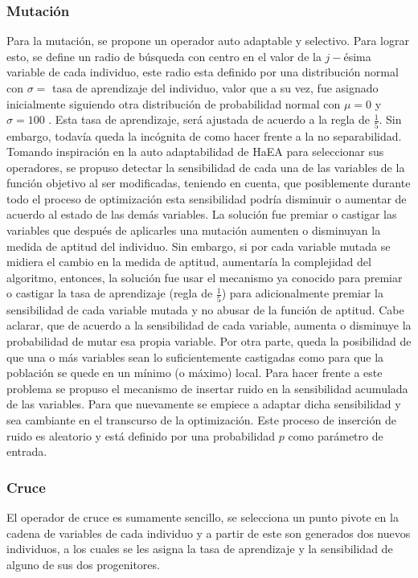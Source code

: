 \documentclass{llncs}
\begin{document}
\subsubsection{Mutación}
Para la mutación, se propone un operador auto adaptable y selectivo. Para lograr esto, se define un radio de búsqueda con centro en el valor de la $j-$ésima variable de cada individuo, este radio esta definido por una distribución normal con $\sigma=$ tasa de aprendizaje del individuo, valor que a su vez, fue asignado inicialmente siguiendo otra distribución de probabilidad normal con $\mu=0$ y $\sigma=100$ . Esta tasa de aprendizaje, será ajustada de acuerdo a la regla de $\frac{1}{5}$. Sin embargo, todavía queda la incógnita de como hacer frente a la no separabilidad. 
Tomando inspiración en la auto adaptabilidad de HaEA  \cite{gomez} para seleccionar sus operadores, se propuso detectar la sensibilidad de cada una de las variables de la función objetivo al ser modificadas, teniendo en cuenta, que posiblemente durante todo el proceso de optimización esta sensibilidad podría disminuir o aumentar de acuerdo al estado de las demás variables. La solución fue premiar o castigar las variables que después de aplicarles una mutación aumenten o disminuyan la medida de aptitud del individuo. Sin embargo, si por cada variable mutada se midiera el cambio en la medida de aptitud, aumentaría la complejidad del algoritmo, entonces, la solución fue usar el mecanismo ya conocido para premiar o castigar la tasa de aprendizaje (regla de $\frac{1}{5}$) para adicionalmente premiar la sensibilidad de cada variable mutada y no abusar de la función de aptitud.
Cabe aclarar, que de acuerdo a la sensibilidad de cada variable, aumenta o disminuye la probabilidad de mutar esa propia variable.
Por otra parte, queda la posibilidad de que una o más variables sean lo suficientemente castigadas como para que la población se quede en un mínimo (o máximo) local. Para hacer frente a este problema se propuso el mecanismo de insertar ruido en la sensibilidad acumulada de las variables. Para que nuevamente se empiece a adaptar dicha sensibilidad y sea cambiante en el transcurso de la optimización. Este proceso de inserción de ruido es aleatorio y está definido por una probabilidad $p$ como parámetro de entrada.

\subsubsection{Cruce}
El operador de cruce es sumamente sencillo, se selecciona un punto pivote en la cadena de variables de cada individuo y a partir de este son generados dos nuevos individuos, a los cuales se les asigna la tasa de aprendizaje y la sensibilidad de alguno de sus dos progenitores.
\end{document}
